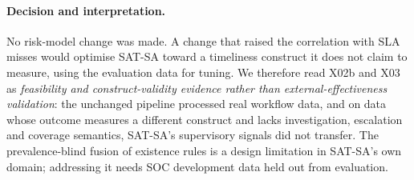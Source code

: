 \paragraph{Decision and interpretation.}
No risk-model change was made. A change that raised the correlation with SLA
misses would optimise SAT-SA toward a timeliness construct it does not claim to
measure, using the evaluation data for tuning. We therefore read X02b and X03 as
\emph{feasibility and construct-validity evidence rather than external-effectiveness
validation}: the unchanged pipeline processed real workflow data, and on data
whose outcome measures a different construct and lacks investigation, escalation
and coverage semantics, SAT-SA's supervisory signals did not transfer. The
prevalence-blind fusion of existence rules is a design limitation in SAT-SA's own
domain; addressing it needs SOC development data held out from evaluation.
